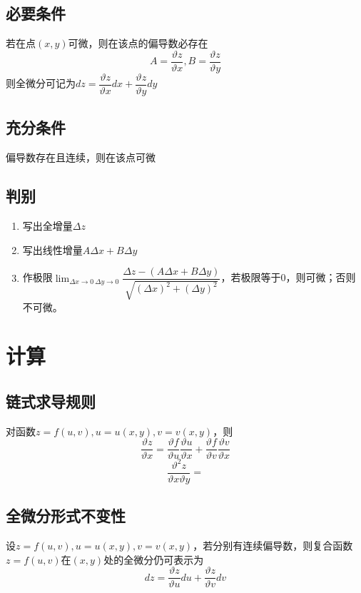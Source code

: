 \subsection{必要条件}
若在点\((x, y)\)可微，则在该点的偏导数必存在\[A = \dfrac{\vartheta z}{\vartheta x}, B = \dfrac{\vartheta z}{\vartheta y}\]
则全微分可记为\(dz = \dfrac{\vartheta z}{\vartheta x}dx + \dfrac{\vartheta z}{\vartheta y}dy\)


\subsection{充分条件}
偏导数存在且连续，则在该点可微


\subsection{判别}
\begin{enumerate}
    \item 写出全增量\(\Delta z\)
    \item 写出线性增量\(A\Delta x + B\Delta y\)
    \item 作极限\(\displaystyle\lim_{\Delta x \to 0\ \Delta y \to 0}\dfrac{\Delta z - (A\Delta x + B\Delta y)}{\sqrt{(\Delta x)^2 + (\Delta y)^2}}\)，若极限等于0，则可微；否则不可微。
\end{enumerate}



\section{计算}

\subsection{链式求导规则}
对函数\(z = f(u, v), u = u(x, y), v = v(x, y)\)，则\[\dfrac{\vartheta z}{\vartheta x} = \dfrac{\vartheta f}{\vartheta u}\dfrac{\vartheta u}{\vartheta x} + \dfrac{\vartheta f}{\vartheta v}\dfrac{\vartheta v}{\vartheta x}\]
\[\dfrac{\vartheta^2z}{\vartheta x\vartheta y} = \]


\subsection{全微分形式不变性}
设\(z = f(u, v), u = u(x, y), v = v(x, y)\)，若分别有连续偏导数，则复合函数\(z = f(u, v)\)在\((x, y)\)处的全微分仍可表示为\[dz = \dfrac{\vartheta z}{\vartheta u}du + \dfrac{\vartheta z}{\vartheta v}dv\]

